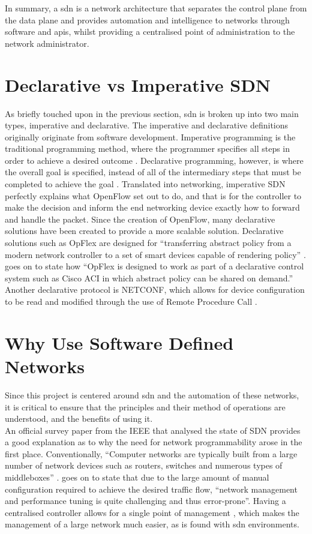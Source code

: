 In summary, a \gls{sdn} is a network architecture that separates the control plane from the data plane and provides automation and intelligence to networks through software and \gls{api}s, whilst providing a centralised point of administration to the network administrator.

\section{Declarative vs Imperative SDN}
\label{litreview:declarativevsimperative}
As briefly touched upon in the
previous section, \gls{sdn} is broken up into two main types, imperative and
declarative. The imperative and declarative definitions originally originate from
software development. Imperative programming is the traditional programming
method, where the programmer specifies all steps in order to achieve a desired
outcome \citep{LATIF2020102563}. Declarative programming, however, is where the overall goal is
specified, instead of all of the intermediary steps that must be completed to
achieve the goal  \citep{LATIF2020102563}. Translated into networking,
imperative SDN perfectly explains what OpenFlow set out to do, and that is for
the controller to make the decision and inform the end networking device
exactly how to forward and handle the packet. Since the creation of OpenFlow,
many declarative solutions have been created to provide a more scalable
solution. Declarative solutions such as OpFlex are designed for ``transferring
abstract policy from a modern network controller to a set of smart devices
capable of rendering policy'' \citep{bhardwaj_2020}. \citeauthor{bhardwaj_2020}
goes on to state how ``OpFlex is designed to work as part of a declarative
control system such as Cisco ACI in which abstract policy can be shared on
demand.'' Another declarative protocol is NETCONF, which allows for device
configuration to be read and modified through the use of Remote Procedure Call
\citep{LATIF2020102563}.

\section{Why Use Software Defined Networks}
\label{litreview:overview}

Since this project is centered around \gls{sdn} and
the
automation of these networks, it is critical to ensure that the principles
and
their method of operations are understood, and the benefits of using it.\\
An official survey paper from the IEEE that analysed the state of SDN provides
a good explanation as to why the need for network programmability arose in the
first place. Conventionally, ``Computer networks are typically built from a
large number of network devices such as routers, switches and numerous types of
middleboxes'' \citep{1}. \citeauthor{1} goes on to state that due to the large
amount of manual configuration required to achieve the desired traffic flow,
“network management and performance tuning is quite challenging and thus
error-prone”.  Having a centralised controller allows for a single point of management \citep{7785187}, which makes the management of a large network much easier, as is found with \gls{sdn} environments.

